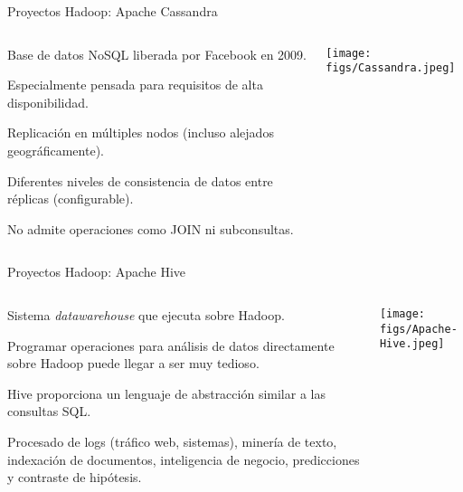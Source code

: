 \begin{frame}{Proyectos Hadoop: Apache Cassandra}
 \begin{columns}[T]
    \begin{column}{.75\textwidth}
     \begin{wideitemize}
      \item Base de datos NoSQL liberada por Facebook en 2009.
      \item Especialmente pensada para requisitos de alta disponibilidad.
      \item Replicación en múltiples nodos (incluso alejados geográficamente).
      \item Diferentes niveles de consistencia de datos entre réplicas
      (configurable).
      \item No admite operaciones como JOIN ni subconsultas.

    \end{wideitemize}
    \end{column}
    \begin{column}{.25\textwidth}
    \vspace*{.7cm}
    \texttt{[image: figs/Cassandra.jpeg]}
    \end{column}
  \end{columns}

\end{frame}


\begin{frame}{Proyectos Hadoop: Apache Hive}
 \begin{columns}[T]
    \begin{column}{.75\textwidth}
     \begin{wideitemize}
      \item Sistema \textit{datawarehouse} que ejecuta sobre Hadoop.
      \item Programar operaciones para análisis de datos directamente sobre
      Hadoop puede llegar a ser muy tedioso.
      \item Hive proporciona un lenguaje de abstracción similar a las consultas
      SQL.
      \item Procesado de logs (tráfico web, sistemas), minería de texto, 
      indexación de documentos, inteligencia de negocio, predicciones y contraste
      de hipótesis.

    \end{wideitemize}
    \end{column}
    \begin{column}{.25\textwidth}
    \vspace*{.7cm}
    \texttt{[image: figs/Apache-Hive.jpeg]}
    \end{column}
  \end{columns}

\end{frame}

